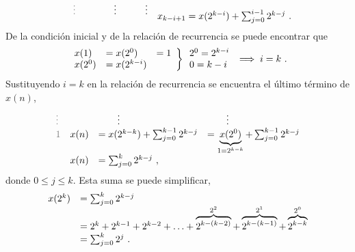 \begin{enumerate}[label=\textbf{\alph*.}]
\begin{solution}
\begin{equation*}
{\begin{array}{l l l l}
                \quad\txtgray\vdots & & \qquad \vdots & \qquad \vdots
            \end{array}}_{%
            \begin{array}{c}
                x_{k - i + 1} = x(2^{k - i}) + \sum_{j=0}^{i-1} 2^{k - j}\ .
            \end{array}}
        \end{equation*}
        De la condición inicial y de la relación de recurrencia se puede encontrar que
        \begin{equation*}
            \begin{rcases}
                \begin{array}{l l l}
                    x(1) & = x(2^0) & = 1 \\
                    x(2^0) & = x(2^{k - i})
                \end{array}
            \end{rcases}
            \begin{array}{l l}
                2^0 = 2^{k - i} \\
                0 = k - i
            \end{array}
            \implies i = k\ .
        \end{equation*}
        Sustituyendo $i = k$ en la relación de recurrencia se encuentra el último término de $x(n)$,
        \begin{equation*}
            \begin{array}{l l l l}
                \txtgray\vdots & & \qquad \vdots & \qquad \vdots \\
                \txtgray{1} & x(n) & = x(2^{k - k}) + \sum_{j=0}^{k-1} 2^{k - j} & = \underbrace{x(2^0)}_{1=2^{k - k}} + \sum_{j=0}^{k-1} 2^{k - j} \\
                & x(n) & = \sum_{j=0}^{k} 2^{k - j}\ ,
            \end{array}
        \end{equation*}
        donde $0 \leq j \leq k$. Esta suma se puede simplificar,
        \begin{equation*}
            \begin{array}{l l}
                x(2^k) & = \sum_{j=0}^{k} 2^{k - j} \\
                & = 2^{k} + 2^{k - 1} + 2^{k - 2} + \ldots + \overbrace{2^{k - (k - 2)}}^{2^2} + \overbrace{2^{k - (k - 1)}}^{2^1} + \overbrace{2^{k - k}}^{2^0} \\
                & = \sum_{j = 0}^{k} 2^j\ .
            \end{array}

\end{equation*}
\end{solution}
\end{enumerate}
